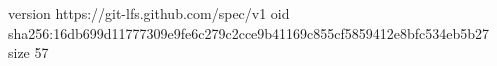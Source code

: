 version https://git-lfs.github.com/spec/v1
oid sha256:16db699d11777309e9fe6c279c2cce9b41169c855cf5859412e8bfc534eb5b27
size 57
